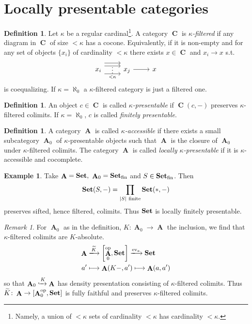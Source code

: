 \documentclass[a4paper,11pt,fullpage,oneside,openany]{amsbook}
\newcommand{\catname}[1]{{\normalfont\textbf{#1}}}
\newcommand{\Set}{\catname{Set}}
\DeclareMathOperator{\op}{\text{op}}
\DeclareMathOperator{\A}{\mathbf{A}}
\DeclareMathOperator{\C}{\mathbf{C}}
\theoremstyle{definition}
\theoremstyle{definition}
\newtheorem{defn}[thm]{Definition} %
\newtheorem{exmp}[thm]{Example} %
\theoremstyle{remark}
\newtheorem{rmk}[thm]{Remark}
\begin{document}
\section{Locally presentable categories}
\begin{defn}
    Let $\kappa$ be a regular cardinal\footnote{Namely, a union of $<\kappa$ sets of cardinality $<\kappa$ has cardinality $<\kappa$.}. A category $\C$ is \emph{$\kappa$-filtered} if any diagram in $\C$ of size $<\kappa$ has a cocone. Equivalently, if it is non-empty and for any set of objects $\{x_i\}$ of cardinality $<\kappa$ there exists $x\in\C$ and $x_i\to x$ s.t.\
    \[
    \begin{tikzcd}
 x_i\arrow[r,shift left=2.2ex] \arrow[r,shift left=1.2ex,""{name=A}] \arrow[r, shift right=1.5ex,"<\kappa"',""{name=B}]\ar[from=A, to=B, phantom, "\vdots"]&x_j \arrow[r]&x 
\end{tikzcd}
    \]
is coequalizing. If $\kappa=\aleph_0$ a $\kappa$-filtered category is just a filtered one.    
\end{defn}
\begin{defn}
An object $c\in\C$ is called \emph{$\kappa$-presentable} if $\C(c,-)$ preserves $\kappa$-filtered colimits. If $\kappa=\aleph_0$, $c$ is called \emph{finitely presentable}. 
\end{defn}
\begin{defn}
A category $\A$ is called \emph{$\kappa$-accessible} if there exists a small subcategory $\A_0$ of $\kappa$-presentable objects such that $\A$ is the closure of $\A_0$ under $\kappa$-filtered colimits. The category $\A$ is called \emph{locally $\kappa$-presentable} if it is $\kappa$-accessible and cocomplete. 
\end{defn}
\begin{exmp}
Take $\A=\Set,\ \A_0=\Set_\text{fin}$ and $S\in\Set_\text{fin}$. Then $$\Set(S,-)=\displaystyle\prod_{|S| \ \text{finite}}\Set(*,-)$$
preserves sifted, hence filtered, colimits. Thus $\Set$ is locally finitely presentable.
\end{exmp}
\begin{rmk}
    For $\A_0$ as in the definition, $K\colon\A_0\to\A$ the inclusion, we find that $\kappa$-filtered colimits are $K$-absolute.
    \begin{align*}
    \A&\xlongrightarrow{\widetilde{K}}\left[\A_0^{\op},\Set\right]\xlongrightarrow{\text{ev}_a}\Set\\
    a'&\longmapsto\A(K-,a')\longmapsto\A(a,a')
    \end{align*}
so that $\A_0\xhookrightarrow{K}\A$ has density presentation consisting of $\kappa$-filtered colimits. Thus $\widetilde{K}\colon\A\to\left[\A_0^{\op},\Set\right]$ is fully faithful and preserves $\kappa$-filtered colimits.
\end{rmk}
\end{document}
